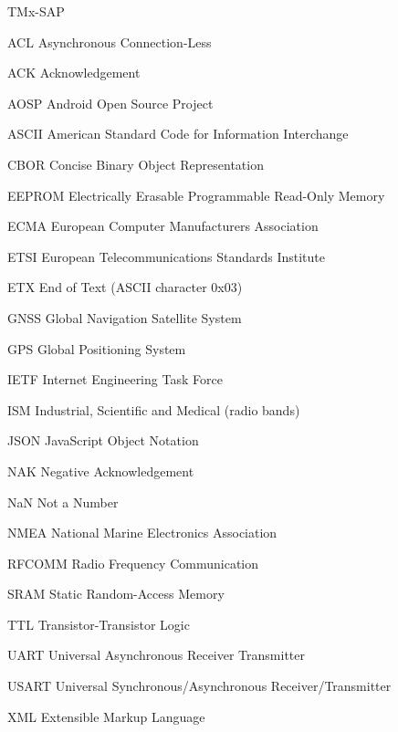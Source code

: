 \label{cha:abkuerzungen}

{\small
\begin{multicols}{2}[]
\begin{deflist}{TMx-SAP}
\raggedright
\item [ACL]		Asynchronous Connection-Less
\item [ACK]		Acknowledgement
\item [AOSP]	Android Open Source Project
\item [ASCII]	American Standard Code for Information Interchange
\item [CBOR]	Concise Binary Object Representation
\item [EEPROM]	Electrically Erasable Programmable Read-Only Memory
\item [ECMA]	European Computer Manufacturers Association
\item [ETSI]	European Telecommunications Standards Institute
\item [ETX]		End of Text (ASCII character 0x03)
\item [GNSS]	Global Navigation Satellite System
\item [GPS]		Global Positioning System
\item [IETF]	Internet Engineering Task Force
\item [ISM]		Industrial, Scientific and Medical (radio bands)
\item [JSON]	JavaScript Object Notation
\item [NAK]		Negative Acknowledgement
\item [NaN]		Not a Number
\item [NMEA]	National Marine Electronics Association
\item [RFCOMM]  Radio Frequency Communication
\item [SRAM]	Static Random-Access Memory
\item [TTL]		Transistor-Transistor Logic
\item [UART]	Universal Asynchronous Receiver Transmitter
\item [USART]	Universal Synchronous/Asynchronous Receiver/Transmitter
\item [XML]	 	Extensible Markup Language
\end{deflist}
\end{multicols}}